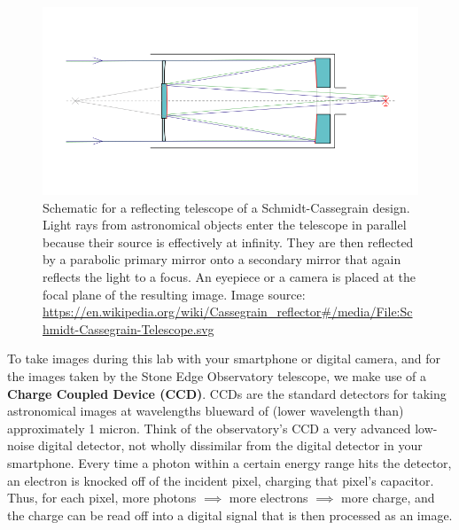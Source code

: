 \begin{figure}
	\centering
	\includegraphics[scale = 0.5]{small-optical-telescopes/Schmidt-Cassegrain-Telescope.png}
	\caption{Schematic for a reflecting telescope of a Schmidt-Cassegrain design. 
		Light rays from astronomical objects enter the telescope in parallel because their source is effectively at infinity. They are then reflected by a parabolic primary mirror onto a secondary mirror that again reflects the light to a focus. An eyepiece or a camera is placed at the focal plane of the resulting image. Image source: \url{https://en.wikipedia.org/wiki/Cassegrain\_reflector\#/media/File:Schmidt-Cassegrain-Telescope.svg}}\label{sot:fig:schmidt}
\end{figure}

To take images during this lab with your smartphone or digital camera, and for the images taken by the Stone Edge Observatory telescope, we make use of a \textbf{Charge Coupled Device (CCD)}.
CCDs are the standard detectors for taking astronomical images at wavelengths blueward of (lower wavelength than) approximately 1 micron. Think of the observatory's CCD a
very advanced low-noise digital detector, not wholly dissimilar from the digital detector in your
smartphone. Every time a photon within a certain energy range hits the detector, an electron is knocked off of the incident pixel, charging that pixel's capacitor. Thus, for each pixel, more photons $\implies$ more electrons $\implies$ more charge, and the charge can be read off into a digital signal that is then processed as an image. 


